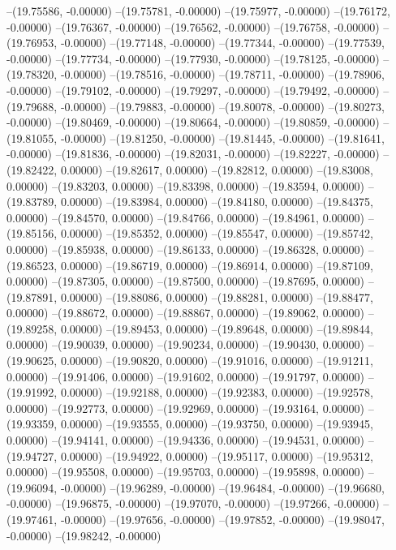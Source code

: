 --(19.75586, -0.00000)
--(19.75781, -0.00000)
--(19.75977, -0.00000)
--(19.76172, -0.00000)
--(19.76367, -0.00000)
--(19.76562, -0.00000)
--(19.76758, -0.00000)
--(19.76953, -0.00000)
--(19.77148, -0.00000)
--(19.77344, -0.00000)
--(19.77539, -0.00000)
--(19.77734, -0.00000)
--(19.77930, -0.00000)
--(19.78125, -0.00000)
--(19.78320, -0.00000)
--(19.78516, -0.00000)
--(19.78711, -0.00000)
--(19.78906, -0.00000)
--(19.79102, -0.00000)
--(19.79297, -0.00000)
--(19.79492, -0.00000)
--(19.79688, -0.00000)
--(19.79883, -0.00000)
--(19.80078, -0.00000)
--(19.80273, -0.00000)
--(19.80469, -0.00000)
--(19.80664, -0.00000)
--(19.80859, -0.00000)
--(19.81055, -0.00000)
--(19.81250, -0.00000)
--(19.81445, -0.00000)
--(19.81641, -0.00000)
--(19.81836, -0.00000)
--(19.82031, -0.00000)
--(19.82227, -0.00000)
--(19.82422, 0.00000)
--(19.82617, 0.00000)
--(19.82812, 0.00000)
--(19.83008, 0.00000)
--(19.83203, 0.00000)
--(19.83398, 0.00000)
--(19.83594, 0.00000)
--(19.83789, 0.00000)
--(19.83984, 0.00000)
--(19.84180, 0.00000)
--(19.84375, 0.00000)
--(19.84570, 0.00000)
--(19.84766, 0.00000)
--(19.84961, 0.00000)
--(19.85156, 0.00000)
--(19.85352, 0.00000)
--(19.85547, 0.00000)
--(19.85742, 0.00000)
--(19.85938, 0.00000)
--(19.86133, 0.00000)
--(19.86328, 0.00000)
--(19.86523, 0.00000)
--(19.86719, 0.00000)
--(19.86914, 0.00000)
--(19.87109, 0.00000)
--(19.87305, 0.00000)
--(19.87500, 0.00000)
--(19.87695, 0.00000)
--(19.87891, 0.00000)
--(19.88086, 0.00000)
--(19.88281, 0.00000)
--(19.88477, 0.00000)
--(19.88672, 0.00000)
--(19.88867, 0.00000)
--(19.89062, 0.00000)
--(19.89258, 0.00000)
--(19.89453, 0.00000)
--(19.89648, 0.00000)
--(19.89844, 0.00000)
--(19.90039, 0.00000)
--(19.90234, 0.00000)
--(19.90430, 0.00000)
--(19.90625, 0.00000)
--(19.90820, 0.00000)
--(19.91016, 0.00000)
--(19.91211, 0.00000)
--(19.91406, 0.00000)
--(19.91602, 0.00000)
--(19.91797, 0.00000)
--(19.91992, 0.00000)
--(19.92188, 0.00000)
--(19.92383, 0.00000)
--(19.92578, 0.00000)
--(19.92773, 0.00000)
--(19.92969, 0.00000)
--(19.93164, 0.00000)
--(19.93359, 0.00000)
--(19.93555, 0.00000)
--(19.93750, 0.00000)
--(19.93945, 0.00000)
--(19.94141, 0.00000)
--(19.94336, 0.00000)
--(19.94531, 0.00000)
--(19.94727, 0.00000)
--(19.94922, 0.00000)
--(19.95117, 0.00000)
--(19.95312, 0.00000)
--(19.95508, 0.00000)
--(19.95703, 0.00000)
--(19.95898, 0.00000)
--(19.96094, -0.00000)
--(19.96289, -0.00000)
--(19.96484, -0.00000)
--(19.96680, -0.00000)
--(19.96875, -0.00000)
--(19.97070, -0.00000)
--(19.97266, -0.00000)
--(19.97461, -0.00000)
--(19.97656, -0.00000)
--(19.97852, -0.00000)
--(19.98047, -0.00000)
--(19.98242, -0.00000)
